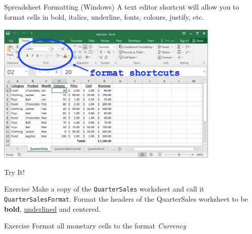 \documentclass[xcolor=svgnames]{beamer}
\begin{document}
\begin{frame}{Spreadsheet Formatting (Windows)}
A text editor shortcut will allow you to format cells in bold, italics, underline, fonts, colours, justify, etc.
\begin{center}
 \includegraphics[width=0.8\textwidth]{FormatShortcut.png}
\end{center}                                         
\end{frame}


\begin{frame}{Try It!}
\begin{exampleblock}{Exercise}
Make a copy of the {\tt QuarterSales} worksheet and call it {\tt QuarterSalesFormat}.  Format the headers of the QuarterSales worksheet to be {\bf bold}, \underline{underlined} and centered.
\end{exampleblock}

\begin{exampleblock}{Exercise}
Format all monetary cells to the format \textit{Currency}
\end{exampleblock}


\end{frame}
\end{document}
